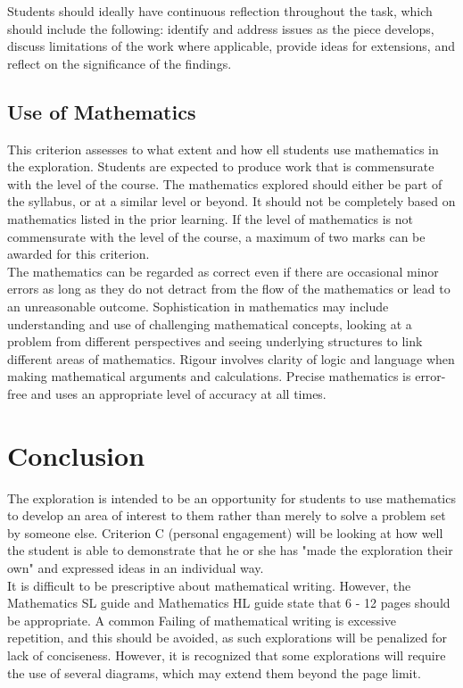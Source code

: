 \documentclass[11pt]{article}
\begin{document}
Students should ideally have continuous reflection throughout the task, which should include the following: identify and address issues as the piece develops, discuss limitations of the work where applicable, provide ideas for extensions, and reflect on the significance of the findings.

\subsection{Use of Mathematics}
This criterion assesses to what extent and how ell students use mathematics in the exploration. Students are expected to produce work that is commensurate with the level of the course. The mathematics explored should either be part of the syllabus, or at a similar level or beyond. It should not be completely based on mathematics listed in the prior learning. If the level of mathematics is not commensurate with the level of the course, a maximum of two marks can be awarded for this criterion.\\

The mathematics can be regarded as correct even if there are occasional minor errors as long as they do not detract from the flow of the mathematics or lead to an unreasonable outcome. Sophistication in mathematics may include understanding and use of challenging mathematical concepts, looking at a problem from different perspectives and seeing underlying structures to link different areas of mathematics. Rigour involves clarity of logic and language when making mathematical arguments and calculations. Precise mathematics is error-free and uses an appropriate level of accuracy at all times.

\section{Conclusion}
The exploration is intended to be an opportunity for students to use mathematics to develop an area of interest to them rather than merely to solve a problem set by someone else. Criterion C (personal engagement) will be looking at how well the student is able to demonstrate that he or she has "made the exploration their own" and expressed ideas in an individual way.\\

It is difficult to be prescriptive about mathematical writing. However, the Mathematics SL guide and Mathematics HL guide state that 6 - 12 pages should be appropriate. A common Failing of mathematical writing is excessive repetition, and this should be avoided, as such explorations will be penalized for lack of conciseness. However, it is recognized that some explorations will require the use of several diagrams, which may extend them beyond the page limit.\\ 
\end{document}
